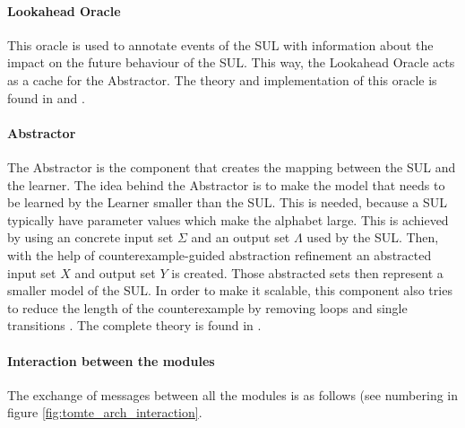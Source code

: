 \documentclass[multi,crop=false,class=article]{standalone}
\begin{document}
\paragraph{Lookahead Oracle} This oracle is used to annotate events of the SUL
with information about the impact on the future behaviour of the SUL. This way,
the Lookahead Oracle acts as a cache for the Abstractor. The theory and
implementation of this oracle is found in \cite{Aarts2014} and \cite{Tomte2014}.

\paragraph{Abstractor} The Abstractor is the component that creates the mapping
between the SUL and the learner. The idea behind the Abstractor is to make the 
model that needs to be learned by the Learner smaller than the SUL. This is 
needed, because a SUL typically have parameter values which make the alphabet 
large. This is achieved by using an concrete input set $\Sigma$ and an output 
set $\Lambda$ used by the SUL. Then, with the help of counterexample-guided 
abstraction refinement\cite{Tomte2014} an abstracted input set $X$ and output 
set $Y$ is created. Those abstracted sets then represent a smaller model of the 
SUL. In order to make it scalable, this component also tries to reduce the 
length of the counterexample by removing loops and single transitions 
\cite{Koopman2014}. The complete theory is found in \cite{Tomte2014}.

\paragraph{Interaction between the modules} The exchange of messages between
all the modules is as follows (see numbering in figure
\ref{fig:tomte_arch_interaction}.
\end{document}
